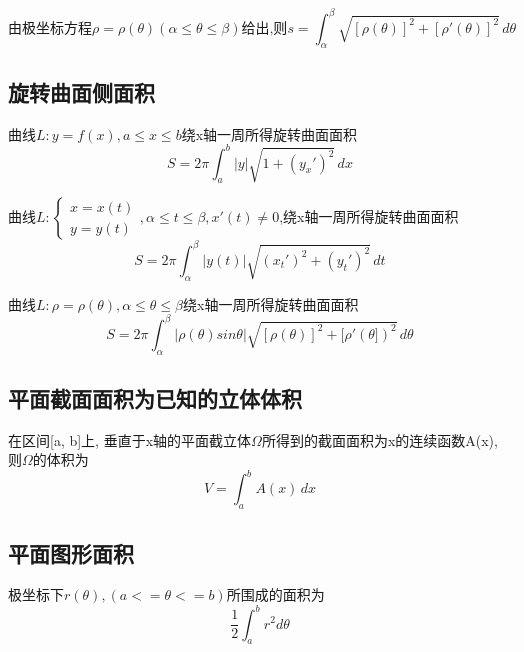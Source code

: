 \begin{displaymath}
\text{由极坐标方程}\rho = \rho(\theta)(\alpha \leq \theta \leq \beta)\text{给出,则}s = \int_{\alpha}^{\beta} \sqrt{[\rho(\theta)]^2 + [\rho'(\theta)]^2} \,d\theta
\end{displaymath}


\subsection{旋转曲面侧面积}

曲线\(L : y = f(x), a \leq x \leq b\)绕x轴一周所得旋转曲面面积
\begin{displaymath}
S = 2\pi \int_{a}^{b}|y|\sqrt{1 + (y_x')^2} \,dx
\end{displaymath}

曲线\(L : \begin{cases}
    x = x(t) \\
    y = y(t)
\end{cases},\alpha \leq t \leq \beta, x'(t) \neq 0\),绕x轴一周所得旋转曲面面积
\begin{displaymath}
S = 2\pi \int_{\alpha}^{\beta}|y(t)|\sqrt{(x_t')^2 + (y_t')^2} \,dt
\end{displaymath}

曲线\(L : \rho = \rho(\theta), \alpha \leq \theta \leq \beta\)绕x轴一周所得旋转曲面面积
\begin{displaymath}
S = 2\pi \int_{\alpha}^{\beta}|\rho(\theta)sin\theta|
\sqrt{[\rho(\theta)]^2 + [\rho'(\theta])^2} \,d\theta
\end{displaymath}


\subsection{平面截面面积为已知的立体体积}

在区间[a, b]上, 垂直于x轴的平面截立体\(\Omega\)所得到的截面面积为x的连续函数A(x), 则\(\Omega\)的体积为
\begin{displaymath}
    V = \int_{a}^{b} A(x) \,dx
\end{displaymath}


\subsection{平面图形面积}

极坐标下\(r(\theta), (a <= \theta <= b)\)所围成的面积为\[\dfrac{1}{2}\int_a^br^2d\theta\]



